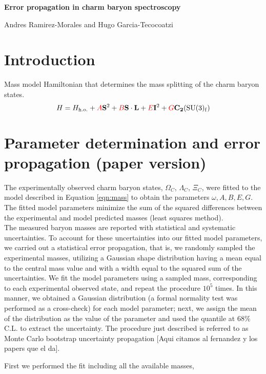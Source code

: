 \documentclass{article}
\begin{document}
\centerline{\LARGE{\textbf{Error propagation in charm baryon spectroscopy}}}
\smallskip
\centerline{Andres Ramirez-Morales and Hugo Garcia-Tecocoatzi}

\section*{Introduction}

Mass model Hamiltonian that determines the mass splitting of the charm baryon states.
\begin{equation}
\label{eqn:mass}
H = H_{\mathrm{h.o.}} + \textcolor{red}{A}\mathbf{S}^{2} + \textcolor{red}{B}\mathbf{S\cdot L} +  \textcolor{red}{E}\mathbf{I}^{2} + \textcolor{red}{G}\mathbf{C_{2}}(\mathrm{SU(3)_{f}})
\end{equation}

\section*{Parameter determination and error propagation (paper version)}

The experimentally observed charm baryon states, $\Omega_{C}$, $\Lambda_{C}$, $\Xi_{C}$, were fitted to the model described in Equation \ref{eqn:mass} to obtain the parameters $\omega, A, B, E, G$. The fitted model parameters minimize the sum of the squared differences between the experimental and model predicted masses (least squares method).\\

The measured baryon masses are reported with statistical and systematic uncertainties. To account for these uncertainties into our fitted model parameters, we carried out a statistical error propagation, that is, we randomly sampled the experimental masses, utilizing a Gaussian shape distribution having a mean equal to the central mass value and with a width equal to the squared sum of the uncertainties. We fit the model parameters using a sampled mass, corresponding to each experimental observed state, and repeat the procedure $10^5$ times. In this manner, we obtained a Gaussian distribution (a formal normality test was performed as a cross-check) for each model parameter; next, we assign the mean of the distribution as the value of the parameter and used the quantile at 68\% C.L. to extract the uncertainty. The procedure just described is referred to as Monte Carlo bootstrap uncertainty propagation [Aqui citamos al fernandez y los papers que el da].

First we performed the fit including all the available masses, 
\end{document}

